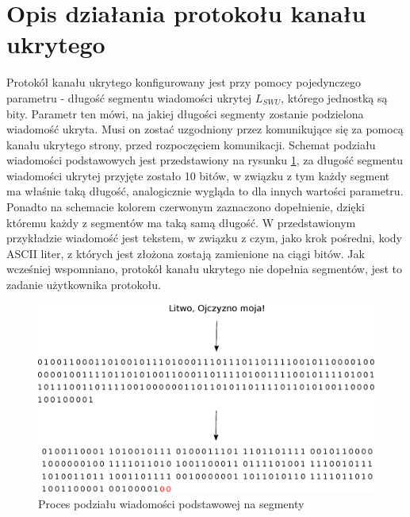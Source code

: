 \documentclass[a4paper, twoside, 12pt]{report}
\begin{document}
    \section{Opis działania protokołu kanału ukrytego}
    Protokół kanału ukrytego konfigurowany jest przy pomocy pojedynczego parametru -
    długość segmentu wiadomości ukrytej \( L_{SWU} \), którego jednostką są bity.
    Parametr ten mówi, na jakiej długości segmenty zostanie podzielona wiadomość
    ukryta. Musi on zostać uzgodniony przez komunikujące się za pomocą kanału
    ukrytego strony, przed rozpoczęciem komunikacji. Schemat podziału wiadomości
    podstawowych jest przedstawiony na rysunku \ref{SEGMENTATION}, za długość
    segmentu wiadomości ukrytej przyjęte zostało 10 bitów, w związku z tym każdy segment
    ma właśnie taką długość, analogicznie wygląda to dla innych wartości parametru.
    Ponadto na schemacie kolorem czerwonym zaznaczono dopełnienie, dzięki któremu
    każdy z segmentów ma taką samą długość.  W przedstawionym przykładzie wiadomość
    jest tekstem, w związku z czym, jako krok pośredni, kody ASCII liter, z których
    jest złożona zostają zamienione na ciągi bitów. Jak wcześniej wspomniano, protokół
    kanału ukrytego nie dopełnia segmentów, jest to zadanie użytkownika protokołu.
        \begin{figure}[h]
                \centering
                \includegraphics[scale=0.8]{podzial_na_segmenty}
                \caption{Proces podziału wiadomości podstawowej na segmenty}
                \label{SEGMENTATION}
        \end{figure}
\end{document}
